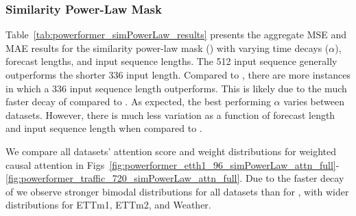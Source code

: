 \subsubsection{Similarity Power-Law Mask}
\label{sm:experiments_powerformer_simPowerLaw}

Table~\ref{tab:powerformer_simPowerLaw_results} presents the aggregate MSE and MAE results for the similarity power-law mask (\fspl) with varying time decays ($\alpha$), forecast lengths, and input sequence lengths.
The 512 input sequence generally outperforms the shorter 336 input length.
Compared to \fpl, there are more instances in which a 336 input sequence length outperforms.
This is likely due to the much faster decay of \fspl{} compared to \fpl.
As expected, the best performing $\alpha$ varies between datasets.
However, there is much less variation as a function of forecast length and input sequence length when compared to \fpl.

We compare all datasets' attention score and weight distributions for weighted causal attention in Figs~\ref{fig:powerformer_etth1_96_simPowerLaw_attn_full}-\ref{fig:powerformer_traffic_720_simPowerLaw_attn_full}.
Due to the faster decay of \fspl{} we observe stronger bimodal distributions for all datasets than for \fpl, with wider \weightCL{} distributions for ETTm1, ETTm2, and Weather.

\begingroup
\renewcommand{\arraystretch}{0.62} %

